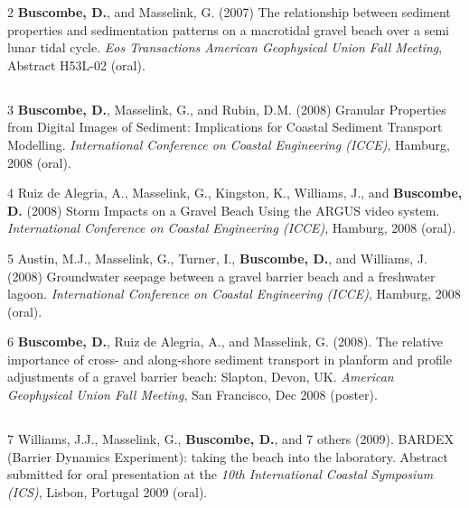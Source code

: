 \documentclass[margin,line]{resume}
\begin{document}
\begin{resume}
\begin{footnotesize}
\begin{list1}
	\item[2] {\bf Buscombe, D.}, and Masselink, G. (2007) The relationship between sediment properties and sedimentation patterns on a macrotidal gravel beach over a semi lunar tidal cycle. {\sl Eos Transactions American Geophysical Union Fall Meeting}, Abstract H53L-02 (oral).
	\end{list1}

	\subsection{}
	\begin{list1}
	\item[3] {\bf Buscombe, D.}, Masselink, G., and Rubin, D.M. (2008) Granular Properties from Digital Images of Sediment: Implications for Coastal Sediment Transport Modelling. {\sl International Conference on Coastal Engineering (ICCE)}, Hamburg, 2008 (oral).\\
	
	\item[4] Ruiz de Alegria, A., Masselink, G., Kingston, K., Williams, J., and {\bf Buscombe, D.} (2008) Storm Impacts on a Gravel Beach Using the ARGUS video system. {\sl International Conference on Coastal Engineering (ICCE)}, Hamburg, 2008 (oral).\\
	
	\item[5] Austin, M.J., Masselink, G., Turner, I., {\bf Buscombe, D.}, and Williams, J. (2008) Groundwater seepage between a gravel barrier beach and a freshwater lagoon. {\sl International Conference on Coastal Engineering (ICCE)}, Hamburg, 2008 (oral).\\
	
	\item[6] {\bf Buscombe, D.}, Ruiz de Alegria, A., and Masselink, G. (2008). The relative importance of cross- and along-shore sediment transport in planform and profile adjustments of a gravel barrier beach: Slapton, Devon, UK. {\sl American Geophysical Union Fall Meeting}, San Francisco, Dec 2008 (poster).
	\end{list1}

	\subsection{}
	\begin{list1}
	\item[7] Williams, J.J., Masselink, G., {\bf Buscombe, D.}, and 7 others (2009). BARDEX (Barrier Dynamics Experiment): taking the beach into the laboratory. Abstract submitted for oral presentation at the {\sl 10th International Coastal Symposium (ICS)}, Lisbon, Portugal 2009 (oral).
	\end{list1}


\end{footnotesize}
\end{resume}
\end{document}
